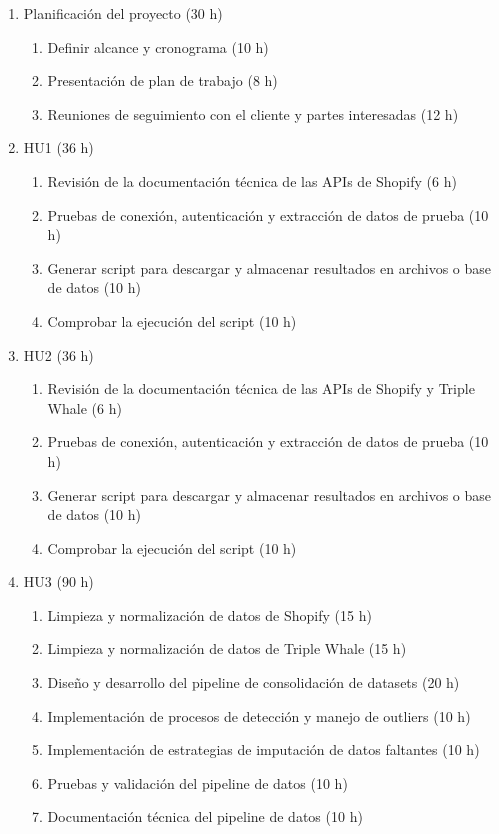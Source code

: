 \documentclass[
11pt, %
]{charter}
\begin{document}
\begin{enumerate}
\item Planificación del proyecto (30 h)
\begin{enumerate}

\item Definir alcance y cronograma (10 h)
\item Presentación de plan de trabajo (8 h)
\item Reuniones de seguimiento con el cliente y partes interesadas (12 h)
\end{enumerate}

\item HU1 (36 h)
\begin{enumerate}
\item Revisión de la documentación técnica de las APIs de Shopify (6 h)
\item Pruebas de conexión, autenticación y extracción de datos de prueba (10 h)
\item Generar script para descargar y almacenar resultados en archivos o base de datos (10 h)
\item Comprobar la ejecución del script (10 h)
\end{enumerate}


\item HU2 (36 h)
\begin{enumerate}
\item Revisión de la documentación técnica de las APIs de Shopify y Triple Whale (6 h)
\item Pruebas de conexión, autenticación y extracción de datos de prueba (10 h)
\item Generar script para descargar y almacenar resultados en archivos o base de datos (10 h)
\item Comprobar la ejecución del script (10 h)
\end{enumerate}


\item HU3 (90 h)
\begin{enumerate}
\item Limpieza y normalización de datos de Shopify (15 h)
\item Limpieza y normalización de datos de Triple Whale (15 h)
\item Diseño y desarrollo del pipeline de consolidación de datasets (20 h)
\item Implementación de procesos de detección y manejo de outliers (10 h)
\item Implementación de estrategias de imputación de datos faltantes (10 h)
\item Pruebas y validación del pipeline de datos (10 h)
\item Documentación técnica del pipeline de datos (10 h)
\end{enumerate}



\end{enumerate}
\end{document}
